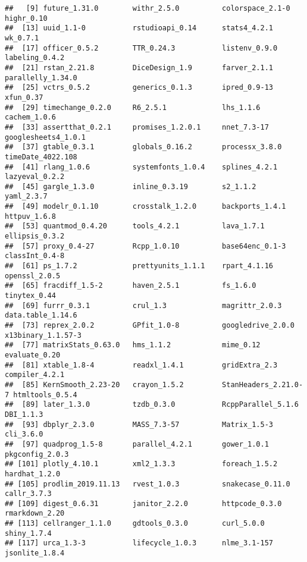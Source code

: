 \documentclass{article}\usepackage[]{graphicx}\usepackage[]{xcolor}
\makeatletter
\newenvironment{kframe}{%
 \def\at@end@of@kframe{}%
 \ifinner\ifhmode%
  \def\at@end@of@kframe{\end{minipage}}%
  \begin{minipage}{\columnwidth}%
 \fi\fi%
 \def\FrameCommand##1{\hskip\@totalleftmargin \hskip-\fboxsep
 \colorbox{shadecolor}{##1}\hskip-\fboxsep
     \hskip-\linewidth \hskip-\@totalleftmargin \hskip\columnwidth}%
 \MakeFramed {\advance\hsize-\width
   \@totalleftmargin\z@ \linewidth\hsize
   \@setminipage}}%
 {\par\unskip\endMakeFramed%
 \at@end@of@kframe}
\newenvironment{knitrout}{}{} %
\makeatother
\begin{document}
\begin{knitrout}
\begin{kframe}
\begin{verbatim}
##   [9] future_1.31.0        withr_2.5.0          colorspace_2.1-0     highr_0.10          
##  [13] uuid_1.1-0           rstudioapi_0.14      stats4_4.2.1         wk_0.7.1            
##  [17] officer_0.5.2        TTR_0.24.3           listenv_0.9.0        labeling_0.4.2      
##  [21] rstan_2.21.8         DiceDesign_1.9       farver_2.1.1         parallelly_1.34.0   
##  [25] vctrs_0.5.2          generics_0.1.3       ipred_0.9-13         xfun_0.37           
##  [29] timechange_0.2.0     R6_2.5.1             lhs_1.1.6            cachem_1.0.6        
##  [33] assertthat_0.2.1     promises_1.2.0.1     nnet_7.3-17          googlesheets4_1.0.1 
##  [37] gtable_0.3.1         globals_0.16.2       processx_3.8.0       timeDate_4022.108   
##  [41] rlang_1.0.6          systemfonts_1.0.4    splines_4.2.1        lazyeval_0.2.2      
##  [45] gargle_1.3.0         inline_0.3.19        s2_1.1.2             yaml_2.3.7          
##  [49] modelr_0.1.10        crosstalk_1.2.0      backports_1.4.1      httpuv_1.6.8        
##  [53] quantmod_0.4.20      tools_4.2.1          lava_1.7.1           ellipsis_0.3.2      
##  [57] proxy_0.4-27         Rcpp_1.0.10          base64enc_0.1-3      classInt_0.4-8      
##  [61] ps_1.7.2             prettyunits_1.1.1    rpart_4.1.16         openssl_2.0.5       
##  [65] fracdiff_1.5-2       haven_2.5.1          fs_1.6.0             tinytex_0.44        
##  [69] furrr_0.3.1          crul_1.3             magrittr_2.0.3       data.table_1.14.6   
##  [73] reprex_2.0.2         GPfit_1.0-8          googledrive_2.0.0    x13binary_1.1.57-3  
##  [77] matrixStats_0.63.0   hms_1.1.2            mime_0.12            evaluate_0.20       
##  [81] xtable_1.8-4         readxl_1.4.1         gridExtra_2.3        compiler_4.2.1      
##  [85] KernSmooth_2.23-20   crayon_1.5.2         StanHeaders_2.21.0-7 htmltools_0.5.4     
##  [89] later_1.3.0          tzdb_0.3.0           RcppParallel_5.1.6   DBI_1.1.3           
##  [93] dbplyr_2.3.0         MASS_7.3-57          Matrix_1.5-3         cli_3.6.0           
##  [97] quadprog_1.5-8       parallel_4.2.1       gower_1.0.1          pkgconfig_2.0.3     
## [101] plotly_4.10.1        xml2_1.3.3           foreach_1.5.2        hardhat_1.2.0       
## [105] prodlim_2019.11.13   rvest_1.0.3          snakecase_0.11.0     callr_3.7.3         
## [109] digest_0.6.31        janitor_2.2.0        httpcode_0.3.0       rmarkdown_2.20      
## [113] cellranger_1.1.0     gdtools_0.3.0        curl_5.0.0           shiny_1.7.4         
## [117] urca_1.3-3           lifecycle_1.0.3      nlme_3.1-157         jsonlite_1.8.4      

\end{verbatim}
\end{kframe}
\end{knitrout}
\end{document}
